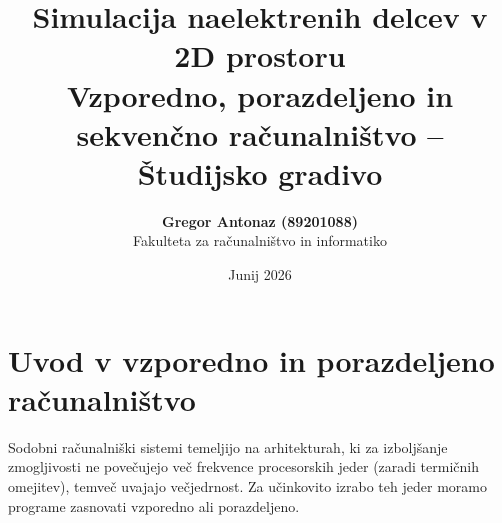\documentclass[11pt,a4paper]{article}
\title{\textbf{Simulacija naelektrenih delcev v 2D prostoru} \\ \large Vzporedno, porazdeljeno in sekven\v{c}no ra\v{c}unalni\v{s}tvo -- \v{S}tudijsko gradivo}
\author{\textbf{Gregor Antonaz (89201088)} \\ \small Fakulteta za ra\v{c}unalni\v{s}tvo in informatiko}
\date{\small Junij 2026}
\begin{document}
\maketitle
\tableofcontents
\newpage

\section{Uvod v vzporedno in porazdeljeno ra\v{c}unalni\v{s}tvo}

Sodobni ra\v{c}unalni\v{s}ki sistemi temeljijo na arhitekturah, ki za izbolj\v{s}anje zmogljivosti ne pove\v{c}ujejo ve\v{c} frekvence procesorskih jeder (zaradi termi\v{c}nih omejitev), temve\v{c} uvajajo ve\v{c}jedrnost. Za u\v{c}inkovito izrabo teh jeder moramo programe zasnovati vzporedno ali porazdeljeno.
\end{document}
